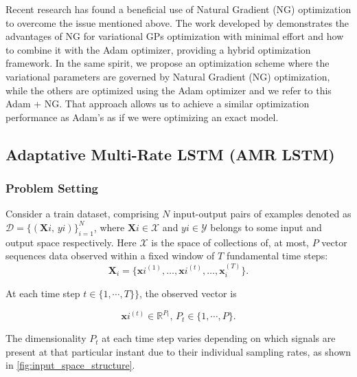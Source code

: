Recent research has found a beneficial use of Natural Gradient (NG) optimization to overcome the issue mentioned above. The work developed by \cite{pmlr-v84-salimbeni18a} demonstrates the advantages of NG for variational GPs optimization with minimal effort and how to combine it with the Adam optimizer, providing a hybrid optimization framework. In the same spirit, we propose an optimization scheme where the variational parameters are governed by Natural Gradient (NG) optimization, while the others are optimized using the Adam optimizer and we refer to this Adam + NG. That approach allows us to achieve a similar optimization performance as Adam's as if we were optimizing an exact model.


\subsection{Adaptative Multi-Rate LSTM (AMR LSTM)}

\subsubsection{Problem Setting}

Consider a train dataset, comprising \(N\) input-output pairs of examples denoted as  $\mathcal{D} = \{(\boldsymbol{X}{i},\,y{i})\}_{i=1}^N$, where 
$\boldsymbol{X}{i}\in\mathcal{X}$ and $y{i}\in\mathcal{Y}$ belongs to some input and output space respectively. Here $\mathcal{X}$ is the space of collections of, at most, \(P\) vector sequences data observed within a fixed window of \(T\) fundamental time steps:
\[
\boldsymbol{X}_i
= \bigl\{\boldsymbol{x}{i}^{(1)}, \dots, \boldsymbol{x}{i}^{(t)}, \dots,\boldsymbol{x}_{i}^{(T)}\bigr\}.
\]

At each time step \(t \in \{1, \cdots, T\}\}\), the observed vector is

\[
\boldsymbol{x}{i}^{(t)} \in \mathbb{R}^{P_t},\,P_t \in \{1, \cdots, P\}.
\]

The dimensionality $P_t$ at each time step varies depending on which signals are present at that particular instant due to their individual sampling rates, as shown in \cref{fig:input_space_structure}.

